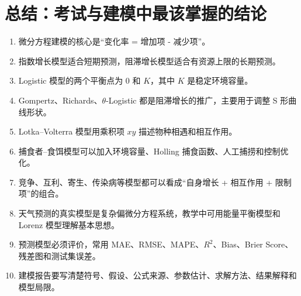\documentclass[11pt,a4paper]{ctexart}
\begin{document}
\section{总结：考试与建模中最该掌握的结论}

\begin{enumerate}[itemsep=0.35em]
\item 微分方程建模的核心是“变化率 = 增加项 - 减少项”。
\item 指数增长模型适合短期预测，阻滞增长模型适合有资源上限的长期预测。
\item Logistic 模型的两个平衡点为 $0$ 和 $K$，其中 $K$ 是稳定环境容量。
\item Gompertz、Richards、$\theta$-Logistic 都是阻滞增长的推广，主要用于调整 S 形曲线形状。
\item Lotka--Volterra 模型用乘积项 $xy$ 描述物种相遇和相互作用。
\item 捕食者--食饵模型可以加入环境容量、Holling 捕食函数、人工捕捞和控制优化。
\item 竞争、互利、寄生、传染病等模型都可以看成“自身增长 + 相互作用 + 限制项”的组合。
\item 天气预测的真实模型是复杂偏微分方程系统，教学中可用能量平衡模型和 Lorenz 模型理解基本思想。
\item 预测模型必须评价，常用 MAE、RMSE、MAPE、$R^2$、Bias、Brier Score、残差图和测试集误差。
\item 建模报告要写清楚符号、假设、公式来源、参数估计、求解方法、结果解释和模型局限。
\end{enumerate}
\end{document}
